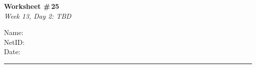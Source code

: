 \documentclass[11pt]{article}
\begin{document}
\noindent
\begin{minipage}[t]{0.55\textwidth}
  \vspace{0pt}
  {\LARGE \textbf{Worksheet \#\,25}} \\[0.3em]
  {\large \textit{Week 13, Day 2: TBD}}
\end{minipage}
\hfill
\begin{minipage}[t]{0.40\textwidth}
  \vspace{0pt}
  \begin{mdframed}[linecolor=black, linewidth=1pt, innertopmargin=10pt, innerbottommargin=10pt]
    \small
    \vspace{0.4cm}
    Name: \underline{\hspace{4.5cm}} \\[1em]
    NetID: \underline{\hspace{4.3cm}} \\[1em]
    Date: \underline{\hspace{4.4cm}} \\
  \end{mdframed}
\end{minipage}

\vspace{1em}
\noindent\rule{\linewidth}{1pt}
\vspace{0.2em}
\end{document}
